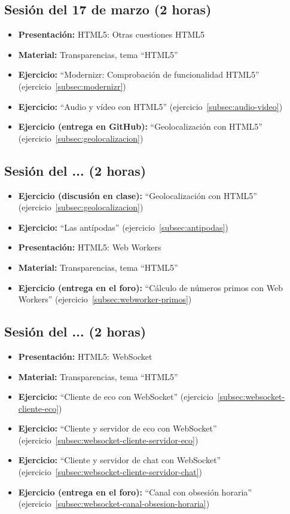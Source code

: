\documentclass[a4paper,12pt]{report}
\begin{document}
\subsection{Sesión del 17 de marzo (2 horas)}

\begin{itemize}
 \item \textbf{Presentación:} HTML5: Otras cuestiones HTML5
 \item \textbf{Material:} Transparencias, tema ``HTML5''
 \item \textbf{Ejercicio:} ``Modernizr: Comprobación de funcionalidad HTML5'' (ejercicio~\ref{subsec:modernizr})
 \item \textbf{Ejercicio:} ``Audio y vídeo con HTML5'' (ejercicio~\ref{subsec:audio-video})
 \item \textbf{Ejercicio (entrega en GitHub):} ``Geolocalización con HTML5'' (ejercicio~\ref{subsec:geolocalizacion}) 
\end{itemize}


\subsection{Sesión del ... (2 horas)}

\begin{itemize}
 \item \textbf{Ejercicio (discusión en clase):} ``Geolocalización con HTML5'' (ejercicio~\ref{subsec:geolocalizacion})
 \item \textbf{Ejercicio:} ``Las antípodas'' (ejercicio~\ref{subsec:antipodas})
 \item \textbf{Presentación:} HTML5: Web Workers
 \item \textbf{Material:} Transparencias, tema ``HTML5''
 \item \textbf{Ejercicio (entrega en el foro):} ``Cálculo de números primos con Web Workers'' (ejercicio~\ref{subsec:webworker-primos})
\end{itemize}



\subsection{Sesión del ... (2 horas)}

\begin{itemize}
 \item \textbf{Presentación:} HTML5: WebSocket
 \item \textbf{Material:} Transparencias, tema ``HTML5''
 \item \textbf{Ejercicio:} ``Cliente de eco con WebSocket'' (ejercicio~\ref{subsec:websocket-cliente-eco})
 \item \textbf{Ejercicio:} ``Cliente y servidor de eco con WebSocket'' (ejercicio~\ref{subsec:websocket-cliente-servidor-eco})
 \item \textbf{Ejercicio:} ``Cliente y servidor de chat con WebSocket'' (ejercicio~\ref{subsec:websocket-cliente-servidor-chat})
 \item \textbf{Ejercicio (entrega en el foro):} ``Canal con obsesión horaria'' (ejercicio~\ref{subsec:websocket-canal-obsesion-horaria})
\end{itemize}
\end{document}

